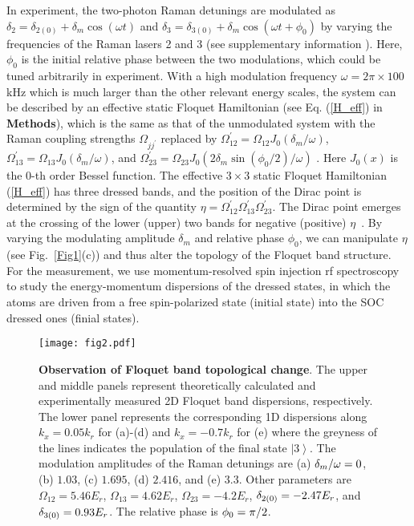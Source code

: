 \documentclass[aps,prl,twocolumn,floatfix,reprint]{revtex4}
\begin{document}
In experiment, the two-photon Raman detunings are modulated as $\delta
_{2}=\delta _{2(0)}+\delta _{m}\cos (\omega t)$ and $\delta _{3}=\delta
_{3(0)}+\delta _{m}\cos (\omega t+\phi _{0})$ by varying the frequencies of
the Raman lasers 2 and 3 (see supplementary information \cite{supp}). Here, $%
\phi _{0}$ is the initial relative phase between the two modulations, which
could be tuned arbitrarily in experiment. With a high modulation frequency $%
\omega =2\pi \times 100$ kHz which is much larger than the other relevant
energy scales, the system can be described by an effective static Floquet
Hamiltonian (see Eq. (\ref{H_eff}) in \textbf{Methods}), which is the same
as that of the unmodulated system with the Raman coupling strengths $\Omega
_{jj^{\prime }}$ replaced by $\Omega _{12}^{\prime }=\Omega _{12}J_{0}\left(
\delta _{m}/\omega \right) $, $\Omega _{13}^{\prime }=\Omega
_{13}J_{0}\left( \delta _{m}/\omega \right) $, and $\Omega _{23}^{\prime
}=\Omega _{23}J_{0}\left( 2\delta _{m}\sin (\phi _{0}/2)/\omega \right) $
\cite{supp}. Here $J_{0}(x)$ is the $0$-th order Bessel function. The
effective $3\times 3 $ static Floquet Hamiltonian (\ref{H_eff}) has three
dressed bands, and the position of the Dirac point is determined by the sign
of the quantity $\eta =\Omega _{12}^{\prime }\Omega _{13}^{\prime }\Omega
_{23}^{\prime }$. The Dirac point emerges at the crossing of the lower
(upper) two bands for negative (positive) $\eta $~\cite{Huang15}. By varying
the modulating amplitude $\delta _{m}$ and relative phase $\phi _{0}$, we
can manipulate $\eta $ (see Fig.~\ref{Fig1}(c)) and thus alter the topology
of the Floquet band structure. For the measurement, we use momentum-resolved
spin injection rf spectroscopy to study the energy-momentum dispersions of
the dressed states, in which the atoms are driven from a free spin-polarized
state (initial state) into the SOC dressed ones (finial states).

\begin{figure*}[t]
\centerline{
\texttt{[image: fig2.pdf]}}
\caption{\textbf{Observation of Floquet band topological change}.
The upper and middle panels represent theoretically calculated and
experimentally measured 2D Floquet band dispersions, respectively.
The lower panel represents the corresponding 1D dispersions along
$k_{x}=0.05k_{r}$ for (a)-(d) and $k_{x}=-0.7k_{r}$ for (e) where
the greyness of the lines indicates the population of the final state $%
\left\vert 3\right\rangle $. The modulation amplitudes of the Raman
detunings are (a) $\protect\delta _{m}/\protect\omega =0$, (b) $1.03$, (c) $%
1.695$, (d) $2.416$, and (e) $3.3$. Other parameters are $\Omega
_{12}=5.46E_{r}$, $\Omega _{13}=4.62E_{r}$, $\Omega _{23}=-4.2E_{r}$, $%
\protect\delta _{2(0)}=-2.47E_{r}$, and $\protect\delta _{3(0)}=0.93E_{r}$.
The relative phase is $\protect\phi _{0}=\protect\pi /2$. }
\label{Fig2}
\end{figure*}
\end{document}
